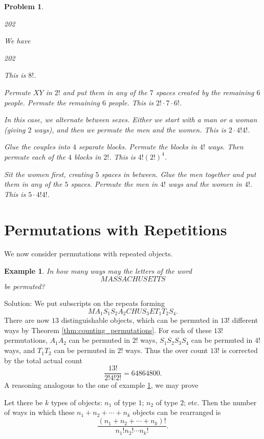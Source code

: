 \documentclass[11pt, openany]{book}
\theoremstyle{change} \theoremheaderfont{\blue\sffamily\bfseries}
\newtheorem{exa}[thm]{Example}
\newtheorem{pro}[thm]{Problem}
\theoremstyle{nonumberplain} \theoremheaderfont{\sffamily\bfseries}
\newcommand{\í}{\'{\i}}
\begin{document}
\begin{multicols}{2}
\begin{pro}
\begin{dingautolist}{202}
\end{dingautolist}
\begin{answer}We have
\begin{dingautolist}{202}
\item   This is $8!$. \item  Permute $XY$ in $2!$ and put them in
any of the $7$ spaces created by the remaining $6$ people. Permute
the remaining $6$ people. This is $2!\cdot 7\cdot 6!$.\item In this
case, we alternate between sexes. Either we start with a man or a
woman (giving $2$ ways), and then we permute the men and the women.
This is $2\cdot 4!4!$.\item  Glue the couples into $4$ separate
blocks. Permute the blocks in $4!$ ways. Then permute each of the
$4$ blocks in $2!$. This is $4!(2!)^4$. \item
 Sit the women first, creating $5$ spaces in between.
Glue the men together and put them in any of the $5$ spaces. Permute
the men in $4!$ ways and the women in $4!$. This is $5\cdot 4!4!$.
\end{dingautolist}
\end{answer}
\end{pro}
\end{multicols}

\section{Permutations with Repetitions} We now
consider permutations with repeated objects.
\begin{exa}\label{exa:permu_repetitions}
In how many ways may the letters of the word $$MASSACHUSETTS$$ be
permuted?
\end{exa}Solution: We put subscripts on the repeats forming
$$MA_1S_1S_2A_2CHUS_3ET_1T_2S_4.$$There are now $13$
distinguishable objects, which can be permuted in $13!$ different
ways by Theorem \ref{thm:counting_permutations}. For each of these
$13!$ permutations, $A_1A_2$ can be permuted in $2!$ ways,
$S_1S_2S_3S_4$ can be permuted in $4!$ ways, and $T_1T_2$ can be
permuted in $2!$ ways. Thus the over count $13!$ is corrected by the
total actual count
$$\frac{13!}{2!4!2!} = 64864800.
$$
A reasoning analogous to the one of example
\ref{exa:permu_repetitions}, we may prove
\begin{thm}
Let there be $k$ types of objects: $n_1$ of type $1$;  $n_2$ of type
$2$; etc. Then the number of ways in which these $n_1 + n_2 + \cdots
+n_k$ objects can be rearranged is $$ \frac{(n_1 + n_2 + \cdots
+n_k)!}{n_1!n_2! \cdots n_k!}. $$
\end{thm}
\end{document}
